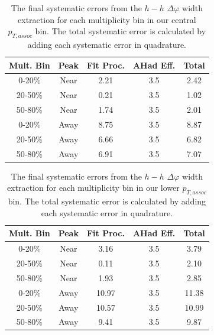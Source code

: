 \documentclass[ALICE,manyauthors]{ALICE_analysis_notes}
\begin{document}
\begin{table}[ht]
\centering
\begin{tabular}{|c|c||c|c||c|}
\hline
Mult. Bin & Peak & Fit Proc. & AHad Eff. & Total \\
\hline

0-20\% & Near & 2.21 & 3.5 & 2.42 \\
20-50\% & Near & 0.21 & 3.5 & 1.02 \\
50-80\% & Near & 1.74 & 3.5 & 2.01 \\
0-20\% & Away & 8.75 & 3.5 & 8.87 \\
20-50\% & Away & 6.66 & 3.5 & 6.82 \\
50-80\% & Away & 6.91 & 3.5 & 7.07 \\

\hline
\end{tabular}
\caption{The final systematic errors from the $h-h$ $\Delta\varphi$ width extraction  for each multiplicity bin in our central $p_{T, assoc}$ bin. The total systematic error is calculated by adding each systematic error in quadrature.}
\label{h_h_width_systematic_table}
\end{table}

\begin{table}[ht]
\centering
\begin{tabular}{|c|c||c|c||c|}
\hline
Mult. Bin & Peak & Fit Proc. & AHad Eff. & Total \\
\hline

0-20\% & Near & 3.16 & 3.5 & 3.79 \\
20-50\% & Near & 0.11 & 3.5 & 2.10 \\
50-80\% & Near & 1.93 & 3.5 & 2.85 \\
0-20\% & Away & 10.97 & 3.5 & 11.38 \\
20-50\% & Away & 10.57 & 3.5 & 10.99 \\
50-80\% & Away & 9.41 & 3.5 & 9.87 \\

\hline
\end{tabular}
\caption{The final systematic errors from the $h-h$ $\Delta\varphi$ width extraction  for each multiplicity bin in our lower $p_{T, assoc}$ bin. The total systematic error is calculated by adding each systematic error in quadrature.}
\label{h_h_width_systematic_table_lowpt}
\end{table}
\end{document}
